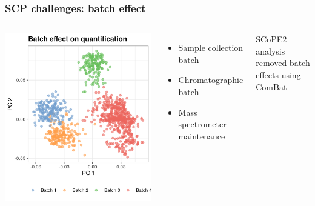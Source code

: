 \documentclass{beamer}
\newcommand{\hcode}[2][lgray]{{\ttfamily\color{vdgray}\colorbox{#1}{#2}}}
\begin{document}
\begin{frame}
  \frametitle{SCP challenges: batch effect}
  
  \begin{columns}
    \includegraphics[width=\linewidth]{figs/PCA_batch_effect.png}
    \begin{itemize}
      \item Sample collection batch
      \item Chromatographic batch
      \item Mass spectrometer maintenance
    \end{itemize}
    SCoPE2 analysis removed batch effects using \hcode{ComBat}
  \end{columns}
  
\end{frame}
\end{document}
